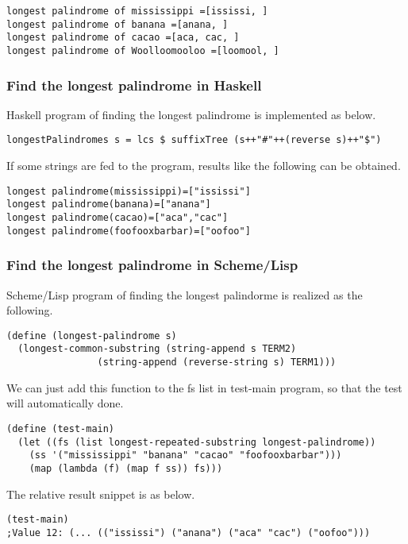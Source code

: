 \documentclass{article}
\begin{document}
\begin{verbatim}
longest palindrome of mississippi =[ississi, ]
longest palindrome of banana =[anana, ]
longest palindrome of cacao =[aca, cac, ]
longest palindrome of Woolloomooloo =[loomool, ]
\end{verbatim}

\subsubsection*{Find the longest palindrome in Haskell}
Haskell program of finding the longest palindrome is implemented as below.

\lstset{language=Haskell}
\begin{lstlisting}
longestPalindromes s = lcs $ suffixTree (s++"#"++(reverse s)++"$")
\end{lstlisting}

If some strings are fed to the program, results like the following can
be obtained.

\begin{verbatim}
longest palindrome(mississippi)=["ississi"]
longest palindrome(banana)=["anana"]
longest palindrome(cacao)=["aca","cac"]
longest palindrome(foofooxbarbar)=["oofoo"]
\end{verbatim}

\subsubsection*{Find the longest palindrome in Scheme/Lisp}
Scheme/Lisp program of finding the longest palindorme is realized as
the following.

\lstset{language=lisp}
\begin{lstlisting}
(define (longest-palindrome s)
  (longest-common-substring (string-append s TERM2) 
			    (string-append (reverse-string s) TERM1)))
\end{lstlisting}

We can just add this function to the fs list in test-main program, so
that the test will automatically done.

\begin{lstlisting}
(define (test-main)
  (let ((fs (list longest-repeated-substring longest-palindrome)) 
	(ss '("mississippi" "banana" "cacao" "foofooxbarbar")))
    (map (lambda (f) (map f ss)) fs)))
\end{lstlisting}

The relative result snippet is as below.

\begin{lstlisting}
(test-main)
;Value 12: (... (("ississi") ("anana") ("aca" "cac") ("oofoo")))
\end{lstlisting}
\end{document}
